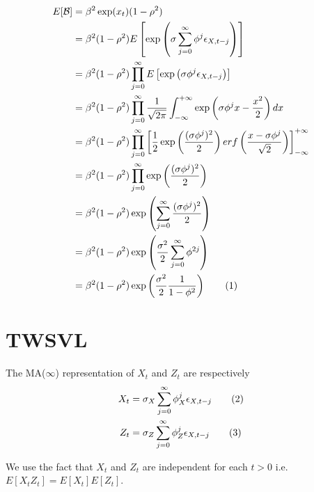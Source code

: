 \documentclass[11pt,a4,twosided,singlespacing,titlepagenumber=on]{scrreprt}
\numberwithin{equation}{chapter} %
\theoremstyle{remark}
\newcommand\numberthis{\addtocounter{equation}{1}\tag{\theequation}}
\begin{document}
\begin{align*}
	E[\mathcal{B}] &= \beta^2 \exp(x_t) (1-\rho^2)\\
				   &= \beta^2 (1-\rho^2) E \left[ \exp \left( \sigma \sum_{j=0}^\infty \phi^j \epsilon_{X, t-j}\right) \right]\\
				   &= \beta^2 (1-\rho^2) \prod_{j=0}^\infty E\left[\exp \left( \sigma \phi^j \epsilon_{X, t-j} \right)  \right] \\
				   &= \beta^2 (1-\rho^2) \prod_{j=0}^\infty \frac{1}{\sqrt{2\pi}}\int^{+\infty}_{-\infty} \exp \left (\sigma \phi^j x - \frac{x^2}{2} \right) dx \\
				   &= \beta^2 (1-\rho^2) \prod_{j=0}^\infty \left[\frac{1}{2} \exp \left(\frac{(\sigma \phi^j)^2}{2} \right) erf \left(\frac{x - \sigma\phi^j}{\sqrt{2}}\right)\right]^{+\infty}_{-\infty} \\
				   &= \beta^2 (1-\rho^2) \prod_{j=0}^\infty \exp \left(\frac{(\sigma \phi^j)^2}{2} \right) \\
				   &= \beta^2 (1-\rho^2) \exp \left( \sum_{j=0}^\infty \frac{(\sigma \phi^j)^2}{2} \right) \\
				   &= \beta^2 (1-\rho^2) \exp \left( \frac{\sigma^2}{2} \sum_{j=0}^\infty \phi^{2j} \right) \\
				   &= \beta^2 (1-\rho^2) \exp \left( \frac{\sigma^2}{2} \frac{1}{1-\phi^{2}}\right) \numberthis
\end{align*}

\section{TWSVL}

The MA($\infty$) representation of $X_t$ and $Z_t$ are respectively
\begin{align*}
X_t &= \sigma_X \sum_{j=0}^\infty \phi_X^j \epsilon_{X, t-j} \numberthis\\
Z_t &= \sigma_Z \sum_{j=0}^\infty \phi_Z^j \epsilon_{X, t-j} \numberthis
\end{align*}


We use the fact that $X_t$ and $Z_t$ are independent for each $t > 0$ i.e. $E[X_t Z_t] = E[X_t] E[Z_t]$.
\end{document}
